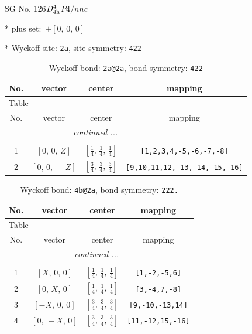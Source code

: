 \documentclass[fleqn,8pt]{jsarticle}
\begin{document}
\setcounter{MaxMatrixCols}{32}

\renewcommand{\tablename}{Table~}
\renewcommand{\figurename}{Figure~}
\begin{center}
\LARGE
SG No. 126\quad$D_{\rm 4h}^{4}$\quad$P4/nnc$\quad[ tetragonal ]
\end{center}

* plus set:\,\,\,$+\left[ 0,\, 0,\, 0 \right]$


* Wyckoff site: {\tt 2a}, site symmetry: {\tt 422}
\renewcommand{\arraystretch}{1.2}
\begin{longtable}{cccc}
\caption{Wyckoff bond: {\tt 2a@2a}, bond symmetry: {\tt 422}}
 \\
 \hline \hline
No. & vector & center & mapping \\ \hline \endfirsthead

\multicolumn{3}{l}{\tablename\ \thetable{}} \\
 \hline \hline
No. & vector & center & mapping \\ \hline \endhead

 \hline \hline
\multicolumn{3}{r}{\footnotesize\it continued ...} \\ \endfoot

 \hline \hline
\multicolumn{3}{r}{} \\ \endlastfoot

1 & $\left[ 0,\, 0,\, Z \right]$ & $\left[ \frac{1}{4},\, \frac{1}{4},\, \frac{1}{4} \right]$ & {\tt [1,2,3,4,-5,-6,-7,-8]} \\ \hline
2 & $\left[ 0,\, 0,\, - Z \right]$ & $\left[ \frac{3}{4},\, \frac{3}{4},\, \frac{3}{4} \right]$ & {\tt [9,10,11,12,-13,-14,-15,-16]} \\
\end{longtable}
\renewcommand{\arraystretch}{1.2}
\begin{longtable}{cccc}
\caption{Wyckoff bond: {\tt 4b@2a}, bond symmetry: {\tt 222.}}
 \\
 \hline \hline
No. & vector & center & mapping \\ \hline \endfirsthead

\multicolumn{3}{l}{\tablename\ \thetable{}} \\
 \hline \hline
No. & vector & center & mapping \\ \hline \endhead

 \hline \hline
\multicolumn{3}{r}{\footnotesize\it continued ...} \\ \endfoot

 \hline \hline
\multicolumn{3}{r}{} \\ \endlastfoot

1 & $\left[ X,\, 0,\, 0 \right]$ & $\left[ \frac{1}{4},\, \frac{1}{4},\, \frac{1}{4} \right]$ & {\tt [1,-2,-5,6]} \\ \hline
2 & $\left[ 0,\, X,\, 0 \right]$ & $\left[ \frac{1}{4},\, \frac{1}{4},\, \frac{1}{4} \right]$ & {\tt [3,-4,7,-8]} \\ \hline
3 & $\left[ - X,\, 0,\, 0 \right]$ & $\left[ \frac{3}{4},\, \frac{3}{4},\, \frac{3}{4} \right]$ & {\tt [9,-10,-13,14]} \\ \hline
4 & $\left[ 0,\, - X,\, 0 \right]$ & $\left[ \frac{3}{4},\, \frac{3}{4},\, \frac{3}{4} \right]$ & {\tt [11,-12,15,-16]} \\
\end{longtable}
\end{document}
